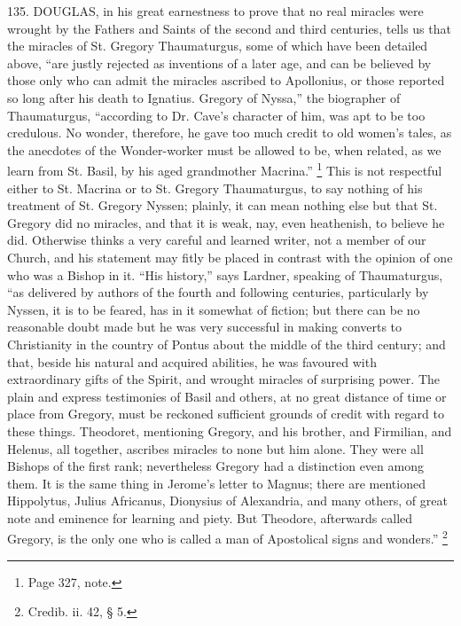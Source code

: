 135.
DOUGLAS, in his great
earnestness to prove that no real miracles were wrought by the Fathers
and Saints of the second and third centuries, tells us that the
miracles of St. Gregory Thaumaturgus, some of which have been detailed
above, ``are justly rejected as inventions of a later age, and can be
believed by those only who can admit the miracles ascribed to
Apollonius, or those reported so long after his death to Ignatius.
Gregory of Nyssa,'' the biographer of Thaumaturgus, ``according to Dr.
Cave's character of him, was apt to be too credulous. No wonder,
therefore, he gave too much credit to old women's tales, as the
anecdotes of the Wonder-worker must be allowed to be, when related, as
we learn from St. Basil, by his aged grandmother Macrina.'' \footnote{Page 327, note.} This is not respectful either to St. Macrina or to St. Gregory
Thaumaturgus, to say nothing of his treatment of St. Gregory
Nyssen; plainly, it can mean nothing else but that St. Gregory did no
miracles, and that it is weak, nay, even heathenish, to believe he
did. Otherwise thinks a very careful and learned writer, not a member
of our Church, and his statement may fitly be placed in contrast with
the opinion of one who was a Bishop in it. ``His history,'' says Lardner,
speaking of Thaumaturgus, ``as delivered by authors of the fourth and
following centuries, particularly by Nyssen, it is to be feared, has
in it somewhat of fiction; but there can be no reasonable doubt made
but he was very successful in making converts to Christianity in the
country of Pontus about the middle of the third century; and that,
beside his natural and acquired abilities, he was favoured with
extraordinary gifts of the Spirit, and wrought miracles of surprising
power. The plain and express testimonies of Basil and others, at no
great distance of time or place from Gregory, must be reckoned
sufficient grounds of credit with regard to these things. Theodoret,
mentioning Gregory, and his brother, and Firmilian, and Helenus, all
together, ascribes miracles to none but him alone. They were all
Bishops of the first rank; nevertheless Gregory had a distinction even
among them. It is the same thing in Jerome's letter to Magnus; there
are mentioned Hippolytus, Julius Africanus, Dionysius of Alexandria,
and many others, of great note and eminence for learning and piety.
But Theodore, afterwards called Gregory, is the only one who is
called a man of Apostolical signs and wonders.'' \footnote{Credib. ii. 42, § 5.}

